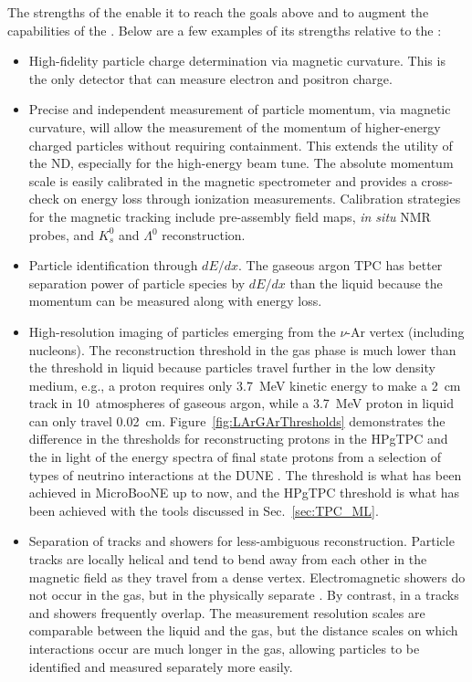 The strengths of the  enable it to reach the goals above and to augment the capabilities of the . Below are a few examples of its strengths relative to the :
\begin{itemize}
     \item High-fidelity particle charge determination via magnetic curvature. This is the only detector that can measure electron and positron charge.
     
     \item Precise and independent measurement of particle momentum, via magnetic curvature, will allow the measurement of the momentum of higher-energy charged particles without requiring containment. This extends the utility of the ND, especially for the high-energy beam tune. The absolute momentum scale is easily calibrated in the magnetic spectrometer and provides a cross-check on energy loss through ionization measurements.  Calibration strategies for the magnetic tracking include pre-assembly field maps, {\it in situ} NMR probes, and $K^0_s$ and $\Lambda\!^0$ reconstruction.
     
      \item Particle identification through $dE/dx$. The gaseous argon TPC has better separation power of particle species by $dE/dx$ than the liquid because the momentum can be measured along with energy loss. 
      
      \item High-resolution imaging of particles emerging from the $\nu$-Ar vertex (including nucleons).  The reconstruction threshold in the gas phase is much lower than the threshold in liquid because particles travel further in the low density medium, e.g., a proton requires only 3.7~MeV kinetic energy to make a 2~cm track in 10~atmospheres of gaseous argon, while a 3.7~MeV proton in liquid can only travel 0.02~cm. Figure~\ref{fig:LArGArThresholds} demonstrates the difference in the thresholds for reconstructing protons in the HPgTPC and the  in light of the energy spectra of final state protons from a selection of types of neutrino interactions at the DUNE . The  threshold is what has been achieved in MicroBooNE up to now, and the HPgTPC threshold is what has been achieved with the tools discussed in Sec.~\ref{sec:TPC_ML}.
   
   
    \item Separation of tracks and showers for less-ambiguous reconstruction.  Particle tracks are locally helical and tend to bend away from each other in the magnetic field as they travel from a dense vertex.  Electromagnetic showers do not occur in the gas, but in the physically separate .  By contrast, in a  tracks and showers frequently overlap.  The measurement resolution scales are comparable between the liquid and the gas, but the distance scales on which interactions occur are much longer in the gas, allowing particles to be identified and measured separately more easily.
   

\end{itemize}
